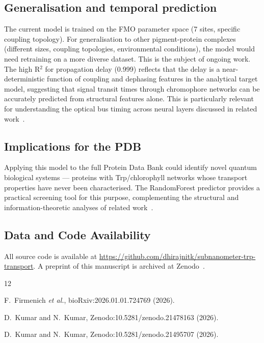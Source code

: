 \documentclass[aps,prl,twocolumn,showpacs,superscriptaddress]{revtex4-2}
\begin{document}
\subsection{Generalisation and temporal prediction}

The current model is trained on the FMO parameter space (7 sites, specific coupling topology). For generalisation to other pigment-protein complexes (different sizes, coupling topologies, environmental conditions), the model would need retraining on a more diverse dataset. This is the subject of ongoing work. The high R$^2$ for propagation delay (0.999) reflects that the delay is a near-deterministic function of coupling and dephasing features in the analytical target model, suggesting that signal transit times through chromophore networks can be accurately predicted from structural features alone. This is particularly relevant for understanding the optical bus timing across neural layers discussed in related work~\cite{TrpCCO2026}.

\subsection{Implications for the PDB}

Applying this model to the full Protein Data Bank could identify novel quantum biological systems --- proteins with Trp/chlorophyll networks whose transport properties have never been characterised. The RandomForest predictor provides a practical screening tool for this purpose, complementing the structural and information-theoretic analyses of related work~\cite{TrpCCO2026}.

\subsection{Data and Code Availability}

All source code is available at \url{https://github.com/dhirajnitk/subnanometer-trp-transport}. A preprint of this manuscript is archived at Zenodo~\cite{MLZenodo2026}.

\FloatBarrier
\begin{thebibliography}{12}

 F.\ Firmenich \textit{et al.}, bioRxiv:2026.01.01.724769 (2026).

 D.\ Kumar and N.\ Kumar, Zenodo:10.5281/zenodo.21478163 (2026).

 D.\ Kumar and N.\ Kumar, Zenodo:10.5281/zenodo.21495707 (2026).

\end{thebibliography}
\end{document}
